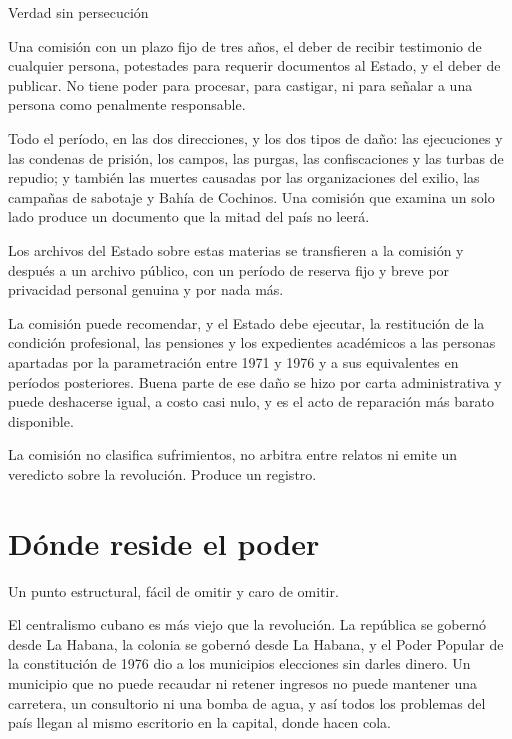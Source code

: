 \begin{design}{Verdad sin persecución}
\label{d:truth}
\begin{rules}
 Una comisión con un plazo fijo de tres años, el deber de recibir
testimonio de cualquier persona, potestades para requerir documentos al Estado, y el
deber de publicar. No tiene poder para procesar, para castigar, ni para señalar a
una persona como penalmente responsable.

 Todo el período, en las dos direcciones, y los dos tipos de daño: las
ejecuciones y las condenas de prisión, los campos, las purgas, las confiscaciones y
las turbas de repudio; y también las muertes causadas por las organizaciones del
exilio, las campañas de sabotaje y Bahía de Cochinos. Una comisión que examina un
solo lado produce un documento que la mitad del país no leerá.

 Los archivos del Estado sobre estas materias se transfieren a la
comisión y después a un archivo público, con un período de reserva fijo y breve por
privacidad personal genuina y por nada más.

 La comisión puede recomendar, y el Estado debe
ejecutar, la restitución de la condición profesional, las pensiones y los
expedientes académicos a las personas apartadas por la parametración entre 1971 y
1976 y a sus equivalentes en períodos posteriores. Buena parte de ese daño se hizo
por carta administrativa y puede deshacerse igual, a costo casi nulo, y es el acto de
reparación más barato disponible.

 La comisión no clasifica sufrimientos, no arbitra
entre relatos ni emite un veredicto sobre la revolución. Produce un registro.
\end{rules}
\end{design}

\section{Dónde reside el poder}

Un punto estructural, fácil de omitir y caro de omitir.

El centralismo cubano es más viejo que la revolución. La república se gobernó desde
La Habana, la colonia se gobernó desde La Habana, y el Poder Popular de la
constitución de 1976 dio a los municipios elecciones sin darles dinero. Un municipio
que no puede recaudar ni retener ingresos no puede mantener una carretera, un
consultorio ni una bomba de agua, y así todos los problemas del país llegan al mismo
escritorio en la capital, donde hacen cola.

